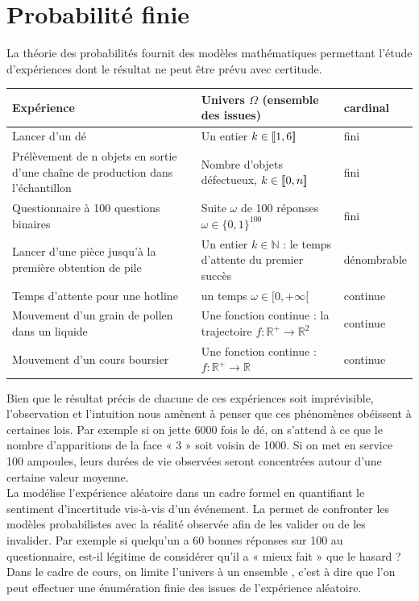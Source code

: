 \documentclass{book}
\begin{document}
\chapter*{Probabilité finie}

La théorie des probabilités fournit des modèles mathématiques permettant
l'étude d'expériences dont le résultat ne peut être prévu avec  
certitude.

\begin{center}

\begin{tabular}{| p{6.5cm}| p{6.5cm} |p{1.7cm} |}
\hline
Expérience & Univers  $\Omega$ (ensemble des issues) & cardinal\\
\hline \hline 
Lancer d'un dé & Un entier $k\in\mathopen\lbrack\!\lbrack1,6 \mathclose\rbrack\!\rbrack$& fini \\
\hline
Prélèvement de n objets en sortie d'une chaîne de production dans l'échantillon & Nombre d'objets défectueux, $k\in\mathopen\lbrack\!\lbrack0,n \mathclose\rbrack\!\rbrack$& fini\\
\hline
Questionnaire à 100 questions  binaires & Suite $\omega$ de 100 réponses $\omega\in\{0,1\}^{100}$& fini\\
\hline
Lancer d'une pièce jusqu'à la première obtention de pile & Un entier $k \in \mathbb{N}$ : le temps d'attente du premier succès&dénombrable\\
\hline
Temps d'attente pour une hotline  & un temps $\omega\in [0,+\infty[$&continue\\
\hline
Mouvement d'un grain de pollen dans un liquide & Une fonction continue : la trajectoire $f:\mathbb{R}^+\to\mathbb{R}^2$&continue  \\
\hline
Mouvement d'un cours boursier & Une fonction continue : $f:\mathbb{R}^+\to\mathbb{R}$&continue\\
\hline
 \end{tabular}
\end{center}
Bien que le résultat précis de chacune de ces expériences soit imprévisible,
l'observation et l'intuition nous amènent à penser que ces phénomènes
obéissent à certaines lois. Par exemple si on jette 6000 fois le dé, on s'attend
à ce que le nombre d'apparitions de la face « 3 » soit voisin de 1000. Si on
met en service 100 ampoules, leurs durées de vie observées seront concentrées
autour d'une certaine valeur moyenne.\\
La  modélise l'expérience aléatoire dans un cadre formel en quantifiant le sentiment d'incertitude vis-à-vis d'un événement. La  permet de confronter les modèles probabilistes avec la réalité observée afin de les valider ou de les invalider. Par
exemple si quelqu'un a 60 bonnes réponses sur 100 au questionnaire, est-il
légitime de considérer qu'il a « mieux fait » que le hasard ?\\
Dans le cadre de cours, on limite l'univers à un ensemble , c'est à dire que l'on peut effectuer une énumération finie des issues de l'expérience aléatoire.    
 
\end{document}
